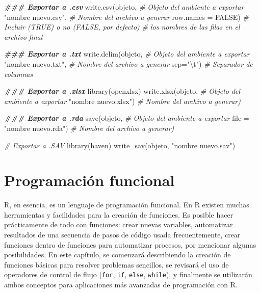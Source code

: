 \documentclass[
]{article}
\newenvironment{Shaded}{\begin{snugshade}}{\end{snugshade}}
\newcommand{\AttributeTok}[1]{\textcolor[rgb]{0.77,0.63,0.00}{#1}}
\newcommand{\CommentTok}[1]{\textcolor[rgb]{0.56,0.35,0.01}{\textit{#1}}}
\newcommand{\ConstantTok}[1]{\textcolor[rgb]{0.00,0.00,0.00}{#1}}
\newcommand{\DocumentationTok}[1]{\textcolor[rgb]{0.56,0.35,0.01}{\textbf{\textit{#1}}}}
\newcommand{\FunctionTok}[1]{\textcolor[rgb]{0.00,0.00,0.00}{#1}}
\newcommand{\NormalTok}[1]{#1}
\newcommand{\SpecialCharTok}[1]{\textcolor[rgb]{0.00,0.00,0.00}{#1}}
\newcommand{\StringTok}[1]{\textcolor[rgb]{0.31,0.60,0.02}{#1}}
\theoremstyle{definition}
\theoremstyle{definition}
\theoremstyle{definition}
\theoremstyle{definition}
\theoremstyle{remark}
\begin{document}
\begin{Shaded}
\begin{Highlighting}[]
\DocumentationTok{\#\#\# Exportar a .csv}
\FunctionTok{write.csv}\NormalTok{(objeto,              }\CommentTok{\# Objeto del ambiente a exportar}
          \StringTok{"nombre nuevo.csv"}\NormalTok{,  }\CommentTok{\# Nombre del archivo a generar}
          \AttributeTok{row.names =} \ConstantTok{FALSE}\NormalTok{)   }\CommentTok{\# Incluir (TRUE) o no (FALSE, por defecto) }
                               \CommentTok{\# los nombres de las filas en el archivo final}

\DocumentationTok{\#\#\# Exportar a .txt}
\FunctionTok{write.delim}\NormalTok{(objeto,              }\CommentTok{\# Objeto del ambiente a exportar}
            \StringTok{"nombre nuevo.txt"}\NormalTok{,  }\CommentTok{\# Nombre del archivo a generar}
            \AttributeTok{sep=}\StringTok{"}\SpecialCharTok{\textbackslash{}t}\StringTok{"}\NormalTok{)            }\CommentTok{\# Separador de columnas}

\DocumentationTok{\#\#\# Exportar a .xlsx}
\FunctionTok{library}\NormalTok{(openxlsx)}
\FunctionTok{write.xlsx}\NormalTok{(objeto,              }\CommentTok{\# Objeto del ambiente a exportar}
           \StringTok{"nombre nuevo.xlsx"}\NormalTok{)  }\CommentTok{\# Nombre del archivo a generar)}

\DocumentationTok{\#\#\# Exportar a .rda}
\FunctionTok{save}\NormalTok{(objeto,              }\CommentTok{\# Objeto del ambiente a exportar}
     \AttributeTok{file =} \StringTok{"nombre nuevo.rda"}\NormalTok{)  }\CommentTok{\# Nombre del archivo a generar)}

\CommentTok{\# Exportar a .SAV}
\FunctionTok{library}\NormalTok{(haven)}
\FunctionTok{write\_sav}\NormalTok{(objeto, }\StringTok{"nombre nuevo.sav"}\NormalTok{)}
\end{Highlighting}
\end{Shaded}

\hypertarget{programaciuxf3n-funcional}{%
\section{\texorpdfstring{\textbf{Programación funcional}}{Programación funcional}}\label{programaciuxf3n-funcional}}

R, en esencia, es un lenguaje de programación funcional. En R existen muchas herramientas y facilidades para la creación de funciones. Es posible hacer prácticamente de todo con funciones: crear nuevas variables, automatizar resultados de una secuencia de pasos de código usada frecuentemente, crear funciones dentro de funciones para automatizar procesos, por mencionar algunas posibilidades. En este capítulo, se comenzará describiendo la creación de funciones básicas para resolver problemas sencillos, se revisará el uso de operadores de control de flujo (\texttt{for}, \texttt{if}, \texttt{else}, \texttt{while}), y finalmente se utilizarán ambos conceptos para aplicaciones más avanzadas de programación con R.
\end{document}
